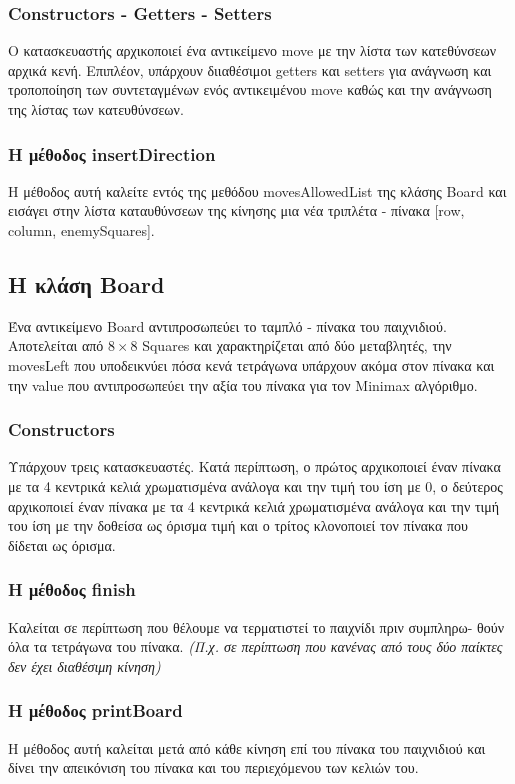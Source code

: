 \documentclass[12pt]{article}
\begin{document}
        \subsubsection{Constructors - Getters - Setters}
        Ο κατασκευαστής αρχικοποιεί ένα αντικείμενο move με την λίστα των κατεθύνσεων αρχικά κενή. Επιπλέον, υπάρχουν διιαθέσιμοι getters και setters για ανάγνωση και τροποποίηση των συντεταγμένων ενός αντικειμένου move καθώς και την ανάγνωση της λίστας των κατευθύνσεων.
        \subsubsection{Η μέθοδος insertDirection}
        Η μέθοδος αυτή καλείτε εντός της μεθόδου movesAllowedList της κλάσης Board και εισάγει στην λίστα καταυθύνσεων της κίνησης μια νέα τριπλέτα - πίνακα [row, column, enemySquares].
    \subsection{Η κλάση Board}
    Ένα αντικείμενο Board αντιπροσωπεύει το ταμπλό - πίνακα του παιχνιδιού. Αποτελείται από $8\times8$ Squares και χαρακτηρίζεται από δύο μεταβλητές, την movesLeft που υποδεικνύει πόσα κενά τετράγωνα υπάρχουν ακόμα στον πίνακα και την value που αντιπροσωπεύει την αξία του πίνακα για τον Minimax αλγόριθμο. 
        \subsubsection{Constructors}
        Υπάρχουν τρεις κατασκευαστές. Κατά περίπτωση, ο πρώτος αρχικοποιεί έναν πίνακα με τα 4 κεντρικά κελιά χρωματισμένα ανάλογα και την τιμή του ίση με 0, ο δεύτερος αρχικοποιεί έναν πίνακα με τα 4 κεντρικά κελιά χρωματισμένα ανάλογα και την τιμή του ίση με την δοθείσα ως όρισμα τιμή και ο τρίτος κλονοποιεί τον πίνακα που δίδεται ως όρισμα. 
        \subsubsection{Η μέθοδος finish}
        Καλείται σε περίπτωση που θέλουμε να τερματιστεί το παιχνίδι πριν συμπληρω-
        θούν όλα τα τετράγωνα του πίνακα. \textit{(Π.χ. σε περίπτωση που κανένας από τους δύο παίκτες δεν έχει διαθέσιμη κίνηση)}
        \subsubsection{Η μέθοδος printBoard}
        Η μέθοδος αυτή καλείται μετά από κάθε κίνηση επί του πίνακα του παιχνιδιού και δίνει την απεικόνιση του πίνακα και του περιεχόμενου των κελιών του.
\end{document}

